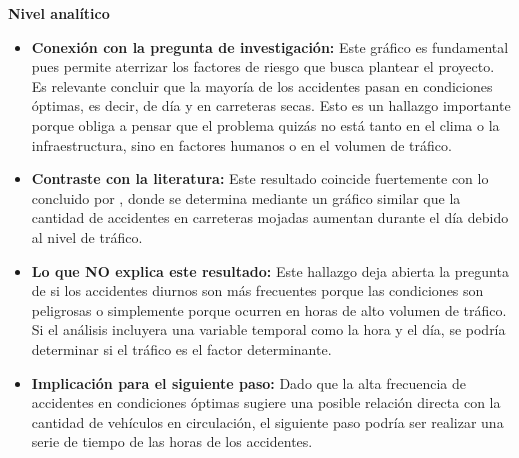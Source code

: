\documentclass[12pt]{article}
\begin{document}
\textbf{Nivel analítico}
\begin{itemize}
    \item \textbf{Conexión con la pregunta de investigación:} Este gráfico es 
    fundamental pues permite aterrizar los factores de riesgo que busca plantear 
    el proyecto. Es relevante concluir que la mayoría de los accidentes pasan en 
    condiciones óptimas, es decir, de día y en carreteras secas. Esto es un hallazgo 
    importante porque obliga a pensar que el problema quizás no está tanto en el 
    clima o la infraestructura, sino en factores humanos o en el volumen de tráfico. \\

    \item \textbf{Contraste con la literatura:} Este resultado coincide 
    fuertemente con lo concluido por \textcite{KARZAN2017}, donde se determina mediante un 
    gráfico similar que la cantidad de accidentes en carreteras mojadas aumentan
    durante el día debido al nivel de tráfico. \\

    \item \textbf{Lo que NO explica este resultado:} Este hallazgo deja abierta 
    la pregunta de si los accidentes diurnos son más frecuentes porque las condiciones
    son peligrosas o simplemente porque ocurren en horas de alto volumen de tráfico. 
    Si el análisis incluyera una variable temporal como la hora y el día, se podría 
    determinar si el tráfico es el factor determinante. \\

    \item \textbf{Implicación para el siguiente paso:}  Dado que la alta frecuencia 
    de accidentes en condiciones óptimas sugiere una posible relación directa con 
    la cantidad de vehículos en circulación, el siguiente paso podría ser realizar
    una serie de tiempo de las horas de los accidentes. \\
\end{itemize}
\end{document}
